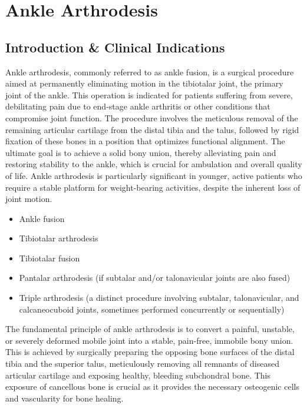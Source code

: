 \chapter{Ankle Arthrodesis}

\section*{Introduction \& Clinical Indications}
Ankle arthrodesis, commonly referred to as ankle fusion, is a surgical procedure aimed at permanently eliminating motion in the tibiotalar joint, the primary joint of the ankle. This operation is indicated for patients suffering from severe, debilitating pain due to end-stage ankle arthritis or other conditions that compromise joint function. The procedure involves the meticulous removal of the remaining articular cartilage from the distal tibia and the talus, followed by rigid fixation of these bones in a position that optimizes functional alignment. The ultimate goal is to achieve a solid bony union, thereby alleviating pain and restoring stability to the ankle, which is crucial for ambulation and overall quality of life. Ankle arthrodesis is particularly significant in younger, active patients who require a stable platform for weight-bearing activities, despite the inherent loss of joint motion.

\begin{itemize}
  \item Ankle fusion
  \item Tibiotalar arthrodesis
  \item Tibiotalar fusion
  \item Pantalar arthrodesis (if subtalar and/or talonavicular joints are also fused)
  \item Triple arthrodesis (a distinct procedure involving subtalar, talonavicular, and calcaneocuboid joints, sometimes performed concurrently or sequentially)
\end{itemize}

The fundamental principle of ankle arthrodesis is to convert a painful, unstable, or severely deformed mobile joint into a stable, pain-free, immobile bony union. This is achieved by surgically preparing the opposing bone surfaces of the distal tibia and the superior talus, meticulously removing all remnants of diseased articular cartilage and exposing healthy, bleeding subchondral bone. This exposure of cancellous bone is crucial as it provides the necessary osteogenic cells and vascularity for bone healing. 

